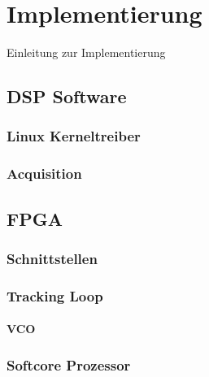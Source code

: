 \chapter{Implementierung}
Einleitung zur Implementierung

\section{DSP Software}

\subsection{Linux Kerneltreiber}\label{Kerneltreiber}


\subsection{Acquisition}

\section{FPGA}
\subsection{Schnittstellen}

\subsection{Tracking Loop}
\subsubsection{VCO}\label{VCOimplementierung}
\subsection{Softcore Prozessor}

